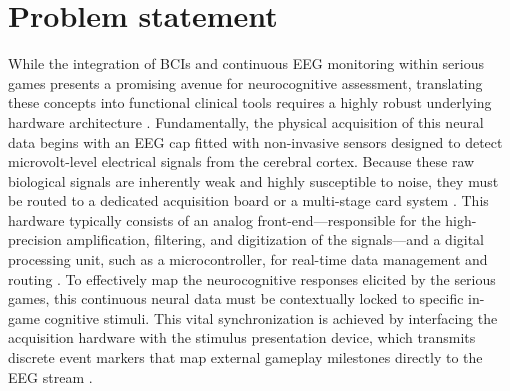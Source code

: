 \section{Problem statement}
\label{sec:problem}

While the integration of BCIs and continuous \gls{EEG} monitoring within serious games presents a promising avenue for neurocognitive assessment, translating these concepts into functional clinical tools requires a highly robust underlying hardware architecture \cite{craik2023design}. Fundamentally, the physical acquisition of this neural data begins with an \gls{EEG} cap fitted with non-invasive sensors designed to detect microvolt-level electrical signals from the cerebral cortex. Because these raw biological signals are inherently weak and highly susceptible to noise, they must be routed to a dedicated acquisition board or a multi-stage card system \cite{armand2024low}. This hardware typically consists of an analog front-end—responsible for the high-precision amplification, filtering, and digitization of the signals—and a digital processing unit, such as a microcontroller, for real-time data management and routing \cite{janapati2023advances}. To effectively map the neurocognitive responses elicited by the serious games, this continuous neural data must be contextually locked to specific in-game cognitive stimuli. This vital synchronization is achieved by interfacing the acquisition hardware with the stimulus presentation device, which transmits discrete event markers that map external gameplay milestones directly to the \gls{EEG} stream \cite{minissi2025role}.

